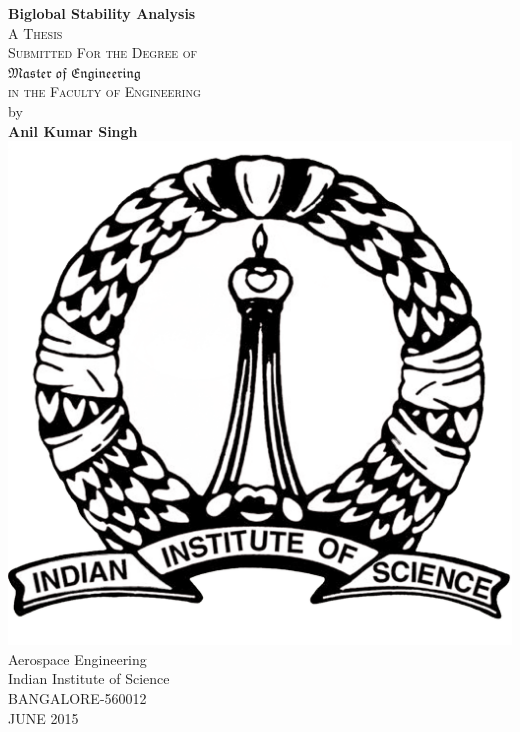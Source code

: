 \begin{titlepage}
\begin{center}

\textsf{\LARGE \textbf{Biglobal Stability Analysis}}\\[2.0cm]
\textsc{A Thesis}\\[0.4cm]
\textsc{Submitted For the Degree of}\\[0.4cm]
$\mathfrak{Master\;of\;Engineering}$\\[0.4cm]
\textsc{in the Faculty of Engineering}\\[3.0cm]
\textnormal{by}\\[0.5cm]
\textbf{Anil Kumar Singh}\\[1.0cm]

\includegraphics[scale=0.5]{plots/iisc_logo}\\[1.0cm]

\textnormal{Aerospace Engineering}\\[0.4cm]
\textnormal{Indian Institute of Science}\\[0.4cm]
\textnormal{BANGALORE-560012}\\[0.6cm]
\textnormal{JUNE 2015}\\[0.6cm]


\end{center}
\end{titlepage}
